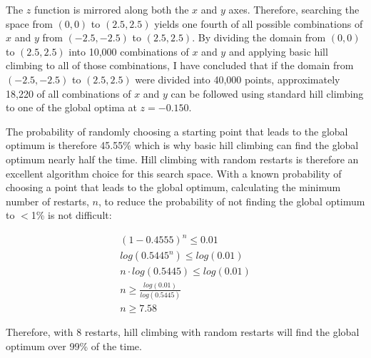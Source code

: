 \documentclass[10pt,a4paper,titlepage]{article}
\begin{document}
The $z$ function is mirrored along both the $x$ and $y$ axes.  Therefore, searching the space from $(0, 0)$ to $(2.5, 2.5)$ yields one fourth of all possible combinations of $x$ and $y$ from $(-2.5, -2.5)$ to $(2.5, 2.5)$.  By dividing the domain from $(0, 0)$ to $(2.5, 2.5)$ into 10,000 combinations of $x$ and $y$ and applying basic hill climbing to all of those combinations, I have concluded that if the domain from $(-2.5, -2.5)$ to $(2.5, 2.5)$ were divided into 40,000 points, approximately 18,220 of all combinations of $x$ and $y$ can be followed using standard hill climbing to one of the global optima at $z=-0.150$.

The probability of randomly choosing a starting point that leads to the global optimum is therefore 45.55\% which is why basic hill climbing can find the global optimum nearly half the time.  Hill climbing with random restarts is therefore an excellent algorithm choice for this search space.  With a known probability of choosing a point that leads to the global optimum, calculating the minimum number of restarts, $n$, to reduce the probability of not finding the global optimum to $<$1\% is not difficult:

\begin{align*}
(1-0.4555)^n \leq 0.01
\\ log(0.5445^n) \leq log(0.01)
\\ n \cdot log(0.5445) \leq log(0.01)
\\ n \geq \frac{log(0.01)}{log(0.5445)}
\\ n \geq 7.58
\end{align*}

Therefore, with 8 restarts, hill climbing with random restarts will find the global optimum over 99\% of the time.
\end{document}
